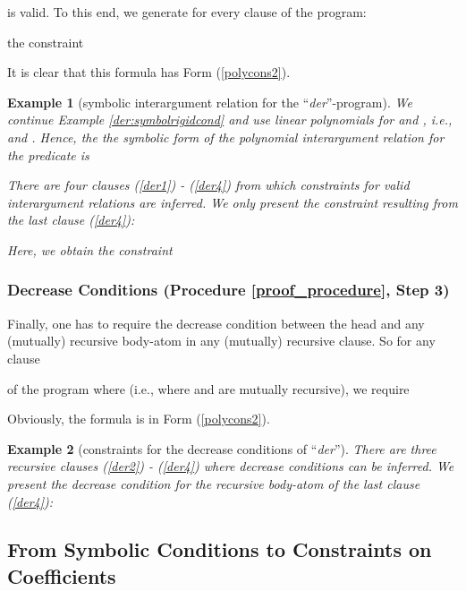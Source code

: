 \documentclass[envcountsame]{tlp}
\newcounter{polycons2ctr}
\newcounter{polycons1ctr}
\newcounter{ex:der-lastsymconsctr}
\newtheorem{example}{Example}
\begin{document}
is valid. To this end,
we generate for every clause of the program:

the constraint 

It is clear that
this formula has Form (\ref{polycons2}).






\begin{example}[symbolic interargument relation for the 
``\textit{der}''-program]
\label{symbolic-der}
 We continue Example \ref{der:symbolrigidcond} and
use linear polynomials for 
 and 
, i.e.,  and
. Hence, the 
the symbolic form of the polynomial interargument relation for the predicate   is

There are four clauses (\ref{der1}) -
(\ref{der4}) from which constraints for 
valid interargument relations are inferred. We only present the constraint
resulting from the last clause
(\ref{der4}):

Here, we obtain the constraint

{\hfill{}}		
\end{example}



\subsubsection{Decrease Conditions (Procedure \ref{proof_procedure}, Step
3)}\label{Decrease Conditions}\hspace*{\fill} 

\vspace*{.2cm}

\noindent
Finally, one has to require the decrease condition between the head and any
(mutually) recursive body-atom in any (mutually) recursive clause.
So for any clause 

of the program where 
 (i.e., where  and  are mutually recursive),
we require

Obviously, 
the formula is in Form 
(\ref{polycons2}). 


\begin{example}[constraints for
the decrease conditions of  ``\textit{der}''] 
\label{der:symboldecreasecond}
	There are three recursive clauses  
(\ref{der2}) - (\ref{der4}) 
where decrease conditions can be
inferred. We present the decrease condition for the 
	recursive body-atom  of the
last clause (\ref{der4}):  
        	
{\hfill{}}
\end{example}


\subsection{From Symbolic Conditions to Constraints on Coefficients}
\label{rewriting}
\end{document}
